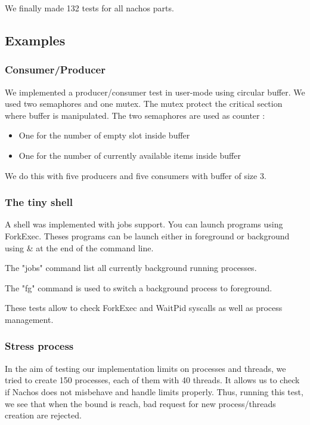 We finally made 132 tests for all nachos parts. 

\subsection{Examples}
\subsubsection{Consumer/Producer}
We implemented a producer/consumer test in user-mode using circular buffer.
We used two semaphores and one mutex. The mutex protect the critical section
where buffer is manipulated. The two semaphores are used as counter :
\begin{itemize}
    \item One for the number of empty slot inside buffer
    \item One for the number of currently available items inside buffer
\end{itemize}

We do this with five producers and five consumers with buffer of size 3.

\subsubsection{The tiny shell}
A shell was implemented with jobs support. You can launch programs using
ForkExec.
Theses programs can be launch either in foreground or background using \& at
the end of the command line.

The "jobs" command list all currently background running processes.

The "fg" command is used to switch a background process to foreground.

These tests allow to check ForkExec and WaitPid syscalls as well as process
management.

\subsubsection{Stress process}
In the aim of testing our implementation limits on processes and threads, we
tried to create 150 processes, each of them with 40 threads.
It allows us to check if Nachos does not misbehave and handle limits properly.
Thus, running this test, we see that when the bound is reach, bad request for
new process/threads creation are rejected.

